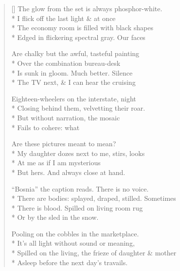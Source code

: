 \label{ch:any_motel}
\settowidth{\versewidth}{Spilled on the living, the frieze of daughter \& mother}
\begin{verse}[\versewidth]
The glow from the set is always phosphor-white.\\*
I flick off the last light \& at once\\*
The economy room is filled with black shapes\\*
Edged in flickering spectral gray.  Our faces

Are chalky but the awful, tasteful painting\\*
Over the combination bureau-desk\\*
Is sunk in gloom. Much better. Silence\\*
The TV next, \& I can hear the cruising

Eighteen-wheelers on the interstate, night\\*
Closing behind them, velvetting their roar.\\*
But without narration, the mosaic\\*
Fails to cohere: what

Are these pictures meant to mean?\\*
My daughter dozes next to me, stirs, looks\\*
At me as if I am mysterious\\*
But hers.  And always close at hand.

``Bosnia'' the caption reads. There is no voice.\\*
There are bodies: splayed, draped, stilled.  Sometimes\\*
There is blood. Spilled on living room rug\\*
Or by the sled in the snow.

Pooling on the cobbles in the marketplace.\\*
It's all light without sound or meaning,\\*
Spilled on the living, the frieze of daughter \& mother\\*
Asleep before the next day's travails.
\end{verse}

